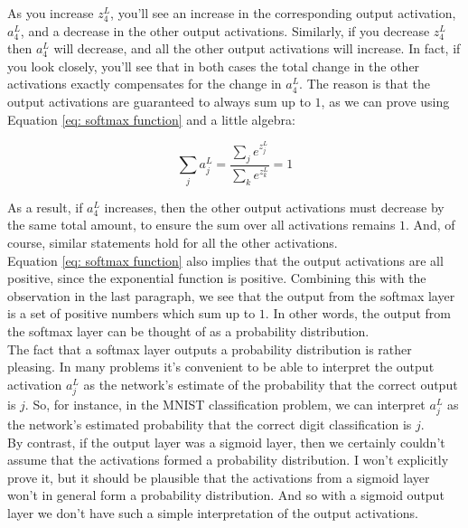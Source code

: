 \documentclass[a4paper,11pt,twoside]{report}
\begin{document}
\datasoftmax
\begin{center}
\animateBars{\datasoftmax}
\end{center}

As you increase $z^L_4$, you'll see an increase in the corresponding output activation, $a^L_4$, and a decrease in the other output activations. Similarly, if you decrease $z^L_4$ then $a^L_4$ will decrease, and all the other output activations will increase. In fact, if you look closely, you'll see that in both cases the total change in the other activations exactly compensates for the change in $a^L_4$. The reason is that the output activations are guaranteed to always sum up to $1$, as we can prove using Equation \ref{eq: softmax function} and a little algebra:

\begin{equation}
\sum_j a^L_j=\frac{\sum_j e^{z^L_j}}{\sum_k e^{z^L_k}}=1
\label{eq: softmax function satisfy probability axiom}
\end{equation}

As a result, if $a^L_4$ increases, then the other output activations must decrease by the same total amount, to ensure the sum over all activations remains $1$. And, of course, similar statements hold for all the other activations.\\

Equation \ref{eq: softmax function} also implies that the output activations are all positive, since the exponential function is positive. Combining this with the observation in the last paragraph, we see that the output from the softmax layer is a set of positive numbers which sum up to $1$. In other words, the output from the softmax layer can be thought of as a probability distribution.\\

The fact that a softmax layer outputs a probability distribution is rather pleasing. In many problems it's convenient to be able to interpret the output activation $a^L_j$ as the network's estimate of the probability that the correct output is $j$. So, for instance, in the MNIST classification problem, we can interpret $a^L_j$ as the network's estimated probability that the correct digit classification is $j$.\\

By contrast, if the output layer was a sigmoid layer, then we certainly couldn't assume that the activations formed a probability distribution. I won't explicitly prove it, but it should be plausible that the activations from a sigmoid layer won't in general form a probability distribution. And so with a sigmoid output layer we don't have such a simple interpretation of the output activations.
\end{document}
